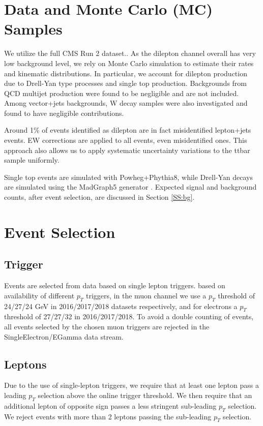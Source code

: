 \section{Data and Monte Carlo (MC) Samples}



We utilize the full CMS Run 2 dataset.. As the \ttbar dilepton channel  overall has very low background level, we rely on Monte Carlo simulation to estimate their rates and kinematic distributions. In particular, we  account for dilepton production due to Drell-Yan type processes and single top production. Backgrounds from QCD multijet production were found to be negligible and are not included. Among vector+jets backgrounds, W decay samples were also investigated and found to have negligible contributions. 

Around 1\% of events identified as \ttbar dilepton are in fact misidentified \ttbar lepton+jets events.  EW corrections are applied to all \ttbar events,  even  misidentified ones. This approach also allows us to apply systematic uncertainty variations to the ttbar sample uniformly.

Single top events are simulated with Powheg+Phythia8, while Drell-Yan decays are simulated using the MadGraph5 generator \cite{Alwall:2014hca}. Expected signal and background counts, after event selection, are discussed in Section \ref{SS:bg}.

\label{S:data}

\clearpage
\section{Event Selection}
\label{S:selection}

\subsection{Trigger}
\label{SS:trigger}
 Events are selected from data based on single lepton triggers. based on availability of different $p_T$ triggers, in the muon channel we use a $p_T$ threshold of 24/27/24 GeV  in 2016/2017/2018 datasets respectively, and for electrons a $p_T$ threshold of 27/27/32 in 2016/2017/2018. To avoid a double counting of events, all events selected by the chosen muon triggers are rejected in the SingleElectron/EGamma data stream. 


\subsection{Leptons}
Due to the use of single-lepton triggers, we require that at least one lepton pass a leading $p_T$ selection above the online trigger threshold. We then require that an additional lepton of opposite sign passes a less stringent sub-leading $p_T$ selection. We reject events with more than 2 leptons passing the sub-leading $p_T$ selection.

